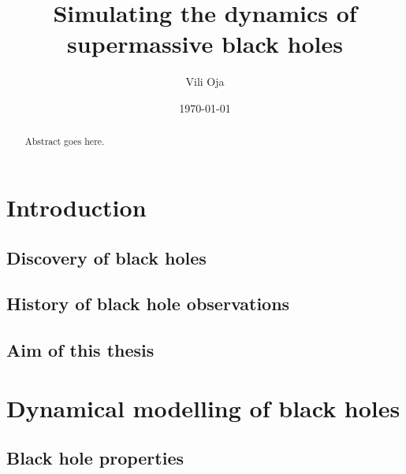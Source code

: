 \documentclass[english, oneside]{HYgradu}
\title{Simulating the dynamics of supermassive black holes}
\author{Vili Oja}
\date{\today}
\begin{document}
\setlength{\parindent}{1cm}
\setlength{\parskip}{0cm}
\maketitle

\begin{abstract}
Abstract goes here.
\end{abstract}

\mytableofcontents



\setlength{\parindent}{.75cm}
\setlength{\parskip}{.6cm}
\chapter{Introduction}


\section{Discovery of black holes}

\section{History of black hole observations}

\section{Aim of this thesis}

\chapter{Dynamical modelling of black holes}

\section{Black hole properties}
\end{document}
